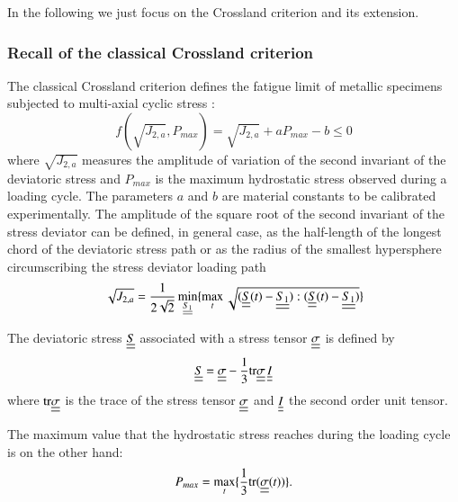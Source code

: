 \documentclass[3p,times,procedia,number]{elsarticle}
\begin{document}
In the following we just focus on the Crossland criterion and its extension.

\subsubsection{Recall of the classical Crossland criterion}

The classical Crossland criterion defines the fatigue limit of metallic specimens subjected to multi-axial cyclic stress\cite{Crossland} : 
\begin{equation}
f(\sqrt{J_{2,a}},P_{max})=\sqrt{J_{2,a}}+aP_{max}-b\leqslant 0\label{eq:crossland}
\end{equation}
where $\sqrt{J_{2,a}}$ measures  the amplitude of variation of the second invariant of the deviatoric stress  and $P_{max}$ is the maximum hydrostatic stress observed during a loading cycle. The parameters $a$ and $b$ are material constants to be calibrated experimentally. The amplitude of the square root of the second invariant of the stress deviator can be defined, in general case, as the half-length of the longest chord of the deviatoric stress path or as the radius of the smallest hypersphere circumscribing the stress deviator loading path \cite{Papadopoulos1997219}
\begin{equation}\sqrt{J_{2,a}}=\frac{1}{2\sqrt{2}}\min \limits_{\uline{\uline{S_1}}}\{\max \limits_{t}\sqrt{(\uline{\uline{S}}(t)-\uline{\uline{S_1}}):(\uline{\uline{S}}(t)-\uline{\uline{S_1}})}\}\end{equation}

The deviatoric stress $\uline{\uline{S}}$ associated with a stress tensor $\uline{\uline{\sigma}}$  is defined by
\begin{equation} \uline{\uline{S}}=\uline{\uline{\sigma}}-\frac{1}{3}\textrm{tr}\uline{\uline{\sigma}}\, \uline{\uline{I}}
\end{equation}
where $\textrm{tr}\uline{\uline{\sigma}}$ is the trace of the stress tensor $\uline{\uline{\sigma}}$ and $\uline{\uline{I}}$ the second order unit tensor.

The maximum value that the hydrostatic stress reaches during the loading cycle is on the other hand:
\begin{equation}
P_{max}=\max\limits_{t}\{\frac{1}{3}\textrm{tr}(\uline{\uline{\sigma}}(t))\}.
\end{equation}
\end{document}
